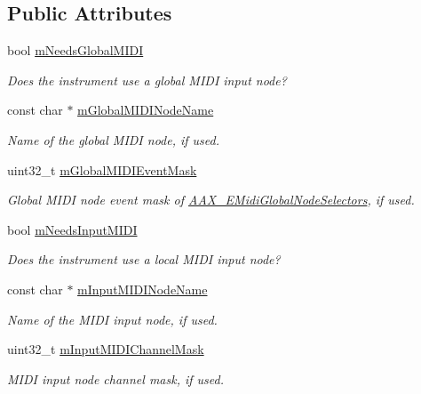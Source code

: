 \subsection*{Public Attributes}
\begin{DoxyCompactItemize}
\item 
bool \mbox{\hyperlink{a01957_ae2d6f984fa92233e27828994a1e7ef79}{m\+Needs\+Global\+M\+I\+DI}}
\begin{DoxyCompactList}\small\item\em Does the instrument use a global M\+I\+DI input node? \end{DoxyCompactList}\item 
const char $\ast$ \mbox{\hyperlink{a01957_ae281e987dc73d0ff5d6ccbceb3383da9}{m\+Global\+M\+I\+D\+I\+Node\+Name}}
\begin{DoxyCompactList}\small\item\em Name of the global M\+I\+DI node, if used. \end{DoxyCompactList}\item 
uint32\+\_\+t \mbox{\hyperlink{a01957_a3b64c64e7b90cb189eb24e5417d9d88b}{m\+Global\+M\+I\+D\+I\+Event\+Mask}}
\begin{DoxyCompactList}\small\item\em Global M\+I\+DI node event mask of \mbox{\hyperlink{a00491_a349dae6bc64bda67a5440cbc6637f92d}{A\+A\+X\+\_\+\+E\+Midi\+Global\+Node\+Selectors}}, if used. \end{DoxyCompactList}\item 
bool \mbox{\hyperlink{a01957_a69f737db7dfa0c8362a0b368dc3e19e9}{m\+Needs\+Input\+M\+I\+DI}}
\begin{DoxyCompactList}\small\item\em Does the instrument use a local M\+I\+DI input node? \end{DoxyCompactList}\item 
const char $\ast$ \mbox{\hyperlink{a01957_ac9206c672bf45367ae0987b6adafb736}{m\+Input\+M\+I\+D\+I\+Node\+Name}}
\begin{DoxyCompactList}\small\item\em Name of the M\+I\+DI input node, if used. \end{DoxyCompactList}\item 
uint32\+\_\+t \mbox{\hyperlink{a01957_acfc35506cfa94a358411aade13070109}{m\+Input\+M\+I\+D\+I\+Channel\+Mask}}
\begin{DoxyCompactList}\small\item\em M\+I\+DI input node channel mask, if used. \end{DoxyCompactList}\item 

\end{DoxyCompactItemize}
